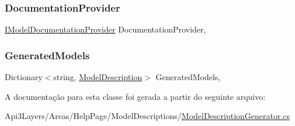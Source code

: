 \subsubsection{\texorpdfstring{Documentation\+Provider}{DocumentationProvider}}
{\footnotesize\ttfamily \hyperlink{interfaceApi3Layers_1_1Areas_1_1HelpPage_1_1ModelDescriptions_1_1IModelDocumentationProvider}{I\+Model\+Documentation\+Provider} Documentation\+Provider\hspace{0.3cm}{\ttfamily [get]}, {\ttfamily [private]}}

\mbox{\label{classApi3Layers_1_1Areas_1_1HelpPage_1_1ModelDescriptions_1_1ModelDescriptionGenerator_a3132a32205bd0f5029c2a01ab8c29e64}} 
\subsubsection{\texorpdfstring{Generated\+Models}{GeneratedModels}}
{\footnotesize\ttfamily Dictionary$<$string, \hyperlink{classApi3Layers_1_1Areas_1_1HelpPage_1_1ModelDescriptions_1_1ModelDescription}{Model\+Description}$>$ Generated\+Models\hspace{0.3cm}{\ttfamily [get]}, {}}



A documentação para esta classe foi gerada a partir do seguinte arquivo\+:\begin{DoxyCompactItemize}
\item 
Api3\+Layers/\+Areas/\+Help\+Page/\+Model\+Descriptions/\hyperlink{ModelDescriptionGenerator_8cs}{Model\+Description\+Generator.\+cs}\end{DoxyCompactItemize}
